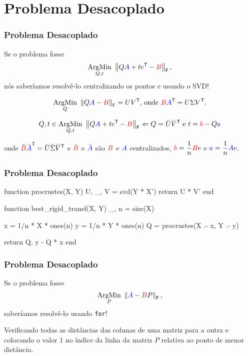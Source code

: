 
\section{Problema Desacoplado}

\begin{frame}[fragile]
  \frametitle{Problema Desacoplado}

  \begin{center}
    Se o problema fosse \[\underset{Q,t}{\text{ArgMin}}\,\, \left\lVert Q\textcolor{blue}{A} + t e^{\mathsf{T}\mkern-1mu} - \textcolor{red}{B}\right\rVert_\mathsf{F},\] nós saberíamos resolvê-lo centralizando os pontos e usando o SVD!


  \[\underset{Q}{\text{ArgMin}}\,\, \left\lVert Q\textcolor{blue}{A} - \textcolor{red}{B}\right\rVert_\mathsf{F} = U V^{\mathsf{T}\mkern-1mu}\text{, onde } \textcolor{red}{B} \textcolor{blue}{A}^{\mathsf{T}\mkern-1mu} = U \Sigma V^{\mathsf{T}\mkern-1mu}.\]


  \[Q , t \in \underset{Q,t}{\text{ArgMin}}\,\, \left\lVert Q\textcolor{blue}{A} + t e^{\mathsf{T}\mkern-1mu} - \textcolor{red}{B}\right\rVert_\mathsf{F} \Leftarrow Q = \bar{U} \bar{V}^{\mathsf{T}\mkern-1mu} \text{ e } t = \textcolor{red}{b} - Q\textcolor{blue}{a}\]

  onde $\bar{\textcolor{red}{B}} \bar{\textcolor{blue}{A}}^{\mathsf{T}\mkern-1mu} = \bar{U} \bar{\Sigma} \bar{V}^{\mathsf{T}\mkern-1mu}$ e $\bar{\textcolor{red}{B}}$ e $\bar{\textcolor{blue}{A}}$ são $\textcolor{red}{B}$ e $\textcolor{blue}{A}$ centralizados, $\textcolor{red}{b} = \dfrac{1}{n} \textcolor{red}{B} e$ e $\textcolor{blue}{a} = \dfrac{1}{n} \textcolor{blue}{A} e$.
  \end{center}
\end{frame}

\begin{frame}[fragile]
  \frametitle{Problema Desacoplado}
  \begin{code}
    function procrustes(X, Y)
      U, _, V = svd(Y * X')
      return U * V'
    end
  \end{code}
  \begin{code}
    function best_rigid_transf(X, Y)
      _, n = size(X)

      x = 1/n * X * ones(n)
      y = 1/n * Y * ones(n)
      Q = procrustes(X .- x, Y .- y)

      return Q, y - Q * x
    end
  \end{code}
\end{frame}

\begin{frame}[fragile]
  \frametitle{Problema Desacoplado}

  \begin{center}
    Se o problema fosse \[\underset{P}{\text{ArgMin}}\,\, \left\lVert\textcolor{blue}{A} - \textcolor{red}{B}P\right\rVert_\mathsf{F},\] saberíamos resolvê-lo usando \texttt{for}!

    \vspace{1cm}
    Verificando todas as distâncias das colunas de uma matriz para a outra e colocando o valor $1$ no índice da linha da matriz $P$ relativa ao ponto de menor distância.
  \end{center}
\end{frame}

